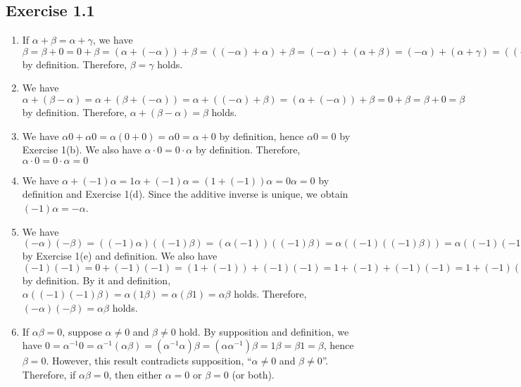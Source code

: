 \documentclass{article}
\begin{document}
\subsection{Exercise 1.1}
\begin{enumerate}[label = (\alph*), resume]
  \item If $\alpha + \beta = \alpha + \gamma$, 
    we have $\beta = \beta + 0 = 0 + \beta = (\alpha + (-\alpha)) + \beta = ((-\alpha) + \alpha) + \beta = (-\alpha) + (\alpha + \beta) = (-\alpha) + (\alpha + \gamma) = ((-\alpha) + \alpha) + \gamma = (\alpha + (-\alpha)) + \gamma = 0 + \gamma = \gamma + 0 = \gamma$ by definition.
    Therefore, $\beta = \gamma$ holds.

  \item We have $\alpha + (\beta - \alpha) = \alpha + (\beta + (-\alpha)) = \alpha + ((-\alpha) + \beta) = (\alpha + (-\alpha)) + \beta = 0 + \beta = \beta + 0 = \beta$ by definition.
    Therefore, $\alpha + (\beta - \alpha) = \beta$ holds.
    
  \item We have $\alpha0 + \alpha0 = \alpha(0 + 0) = \alpha0 = \alpha + 0$ by definition,
    hence $\alpha0 = 0$ by Exercise 1(b).
    We also have $\alpha\cdot0 = 0\cdot\alpha$ by definition.
    Therefore, $\alpha\cdot0 = 0\cdot\alpha = 0$
    
  \item We have $\alpha + (-1)\alpha = 1\alpha + (-1)\alpha = (1 + (-1))\alpha = 0\alpha = 0$ by definition and Exercise 1(d).
      Since the additive inverse is unique,
      we obtain $(-1)\alpha = -\alpha$.
    
  \item We have $(-\alpha)(-\beta) = ((-1)\alpha)((-1)\beta) = (\alpha(-1))((-1)\beta) = \alpha((-1)((-1)\beta)) = \alpha((-1)(-1)\beta)$ by Exercise 1(e) and definition.
    We also have $(-1)(-1) = 0 + (-1)(-1) = (1 + (-1)) + (-1)(-1) = 1 + (-1) + (-1)(-1) = 1 + (-1)((-1) + 1) = 1 + (-1)(1 + (-1)) = 1 + (-1)0 = 1 + 0 = 1$ by definition.
    By it and definition, $\alpha((-1)(-1)\beta) = \alpha(1\beta) = \alpha(\beta1) = \alpha\beta$ holds.
    Therefore, $(-\alpha)(-\beta) = \alpha\beta$ holds.
    
  \item\label{it:ex1.1.g}
    If $\alpha\beta = 0$,
    suppose $\alpha \neq 0$ and $\beta \neq 0$ hold.
    By supposition and definition, we have $0 = \alpha^{-1}0 = \alpha^{-1}(\alpha\beta) = (\alpha^{-1}\alpha)\beta = (\alpha\alpha^{-1})\beta = 1\beta = \beta1 = \beta$,
    hence $\beta = 0$.
    However, this result contradicts supposition, ``$\alpha \neq 0$ and $\beta \neq 0$''.
    Therefore, if $\alpha\beta = 0$, then either $\alpha = 0$ or $\beta = 0$ (or both).
\end{enumerate}
\end{document}
